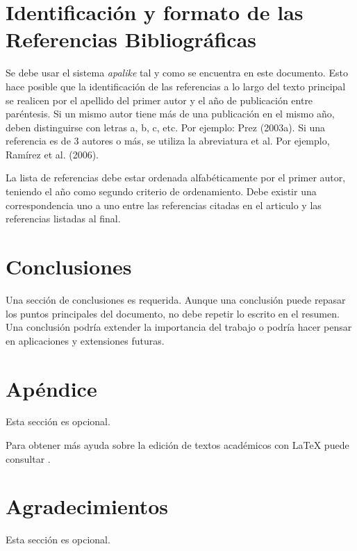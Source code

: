 \documentclass[a4paper,10pt,twoside]{article}
\begin{document}
  \section{Identificación y formato de las Referencias Bibliográficas}
  
  Se debe usar el sistema \emph{apalike} tal y como se encuentra en este documento. Esto hace posible que la identificación de las referencias a lo largo del texto principal se realicen por el apellido del primer autor y el año de publicación entre paréntesis. Si un mismo autor tiene más de una publicación en el mismo año, deben distinguirse con letras a, b, c, etc. Por ejemplo: Prez (2003a). Si una referencia es de 3 autores o más, se utiliza la abreviatura et al. Por ejemplo, Ramírez et al. (2006).

  La lista de referencias debe estar ordenada alfabéticamente por el primer autor, teniendo el año como segundo criterio de ordenamiento. Debe existir una correspondencia uno a uno entre las referencias citadas en el articulo y las referencias listadas al final.
  
  \section{Conclusiones}

  Una sección de conclusiones es requerida. Aunque una conclusión puede repasar los puntos principales del documento, no debe repetir lo escrito en el resumen. Una conclusión podría extender la importancia del trabajo o podría hacer pensar en aplicaciones y extensiones futuras.
  
  \section{Apéndice}

  Esta sección es opcional.
  
  Para obtener más ayuda sobre la edición de textos académicos con LaTeX puede consultar \citep{Borbon2014}. 

  \section{Agradecimientos}

  Esta sección es opcional.





  \label{UltimaPagina}
\end{document}
